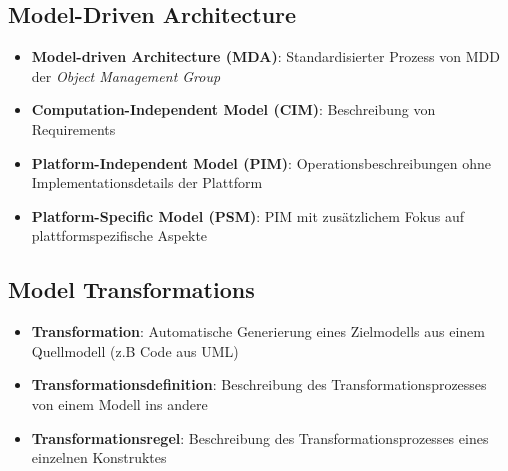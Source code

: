 \subsection{Model-Driven Architecture}
\label{mdd:sub:model_driven_architecture}

\begin{itemize}
	\item \textbf{Model-driven Architecture (MDA)}: Standardisierter Prozess von MDD der \textit{Object Management Group}
	\item \textbf{Computation-Independent Model (CIM)}: Beschreibung von Requirements
	\item \textbf{Platform-Independent Model (PIM)}: Operationsbeschreibungen ohne Implementationsdetails der Plattform
	\item \textbf{Platform-Specific Model (PSM)}: PIM mit zusätzlichem Fokus auf plattformspezifische Aspekte
\end{itemize}

\subsection{Model Transformations}
\label{mdd:sub:model_transformations}

\begin{itemize}
	\item \textbf{Transformation}: Automatische Generierung eines Zielmodells aus einem Quellmodell (z.B Code aus UML)
	\item \textbf{Transformationsdefinition}: Beschreibung des Transformationsprozesses von einem Modell ins andere
	\item \textbf{Transformationsregel}: Beschreibung des Transformationsprozesses eines einzelnen Konstruktes
\end{itemize}